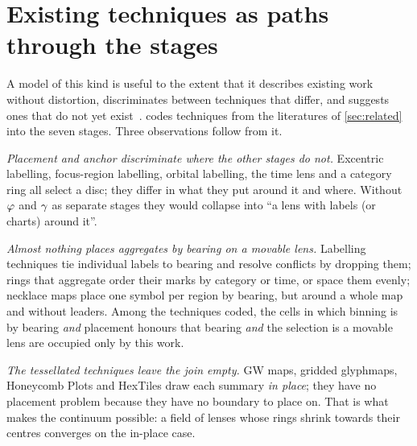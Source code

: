 \section{Existing techniques as paths through the stages}
\label{sec:descriptive}

A model of this kind is useful to the extent that it describes existing work
without distortion, discriminates between techniques that differ, and suggests
ones that do not yet exist~\cite{beaudouinlafon2004designing}. 
codes techniques from the literatures of \cref{sec:related} into the seven
stages. Three observations follow from it.

\emph{Placement and anchor discriminate where the other stages do not.} Excentric
labelling, focus-region labelling, orbital labelling, the time lens and a
category ring all select a disc; they differ in what they put around it and
where. Without $\varphi$ and $\gamma$ as separate stages they would collapse into
``a lens with labels (or charts) around it''.

\emph{Almost nothing places aggregates by bearing on a movable lens.} Labelling
techniques tie individual labels to bearing and resolve conflicts by dropping
them; rings that aggregate order their marks by category or time, or space them
evenly; necklace maps place one symbol per region by bearing, but around a whole
map and without leaders. Among the techniques coded, the cells in which binning
is by bearing \emph{and} placement honours that bearing \emph{and} the selection
is a movable lens are occupied only by this work.

\emph{The tessellated techniques leave the join empty.} GW maps, gridded
glyphmaps, Honeycomb Plots and HexTiles draw each summary \emph{in place}; they
have no placement problem because they have no boundary to place on. That is
what makes the continuum possible: a field of lenses whose rings shrink towards
their centres converges on the in-place case.


